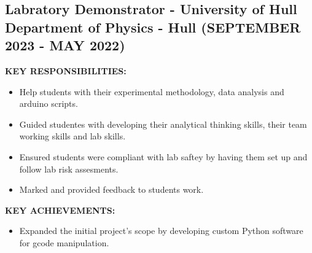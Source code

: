 \documentclass{article}
\begin{document}
\subsection{Labratory Demonstrator - \textnormal{University of Hull Department of Physics - Hull} \footnotesize{(SEPTEMBER 2023 - MAY 2022)}}
\begin{minipage}[t]{1\textwidth}
    \footnotesize{\textbf{KEY RESPONSIBILITIES:}}
    \normalsize{}
    \begin{itemize}[leftmargin=*]
        \item Help students with their experimental methodology, data analysis and arduino scripts. 
        \item Guided studentes with developing their analytical thinking skills, their team working skills and lab skills. 
        \item Ensured students were compliant with lab saftey by having them set up and follow lab risk assesments. 
        \item Marked and provided feedback to students work. 
    \end{itemize}
\end{minipage}
\hfill
\begin{minipage}[t]{1\textwidth}
    \footnotesize{\textbf{KEY ACHIEVEMENTS:}}
    \normalsize{}
    \begin{itemize}[leftmargin=*]
        \item Expanded the initial project’s scope by developing custom Python software for gcode manipulation.
    \end{itemize}
\end{minipage}
\end{document}
